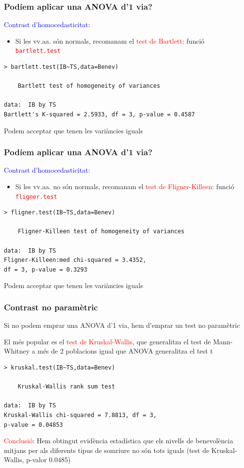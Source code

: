\documentclass[12pt,t]{beamer}
\newcommand{\red}[1]{\textcolor{red}{#1}}
\newcommand{\blue}[1]{\textcolor{blue}{#1}}
\theoremstyle{plain}
\theoremstyle{definition}
\begin{document}
\begin{frame}[fragile] 
\frametitle{Podíem aplicar una ANOVA d'1 via?}\vspace*{-3ex}

\blue{Contrast d'homocedasticitat}:

\begin{itemize}
\item Si les vv.aa. són normals, recomanam el \red{test de Bartlett}: funció \red{\tt bartlett.test}
\end{itemize}
\begin{lstlisting}
> bartlett.test(IB~TS,data=Benev)

	Bartlett test of homogeneity of variances

data:  IB by TS
Bartlett's K-squared = 2.5933, df = 3, p-value = 0.4587
\end{lstlisting}
\medskip

Podem acceptar que tenen les variàncies iguals
\end{frame}

\begin{frame}[fragile] 
\frametitle{Podíem aplicar una ANOVA d'1 via?}\vspace*{-3ex}

\blue{Contrast d'homocedasticitat}:

\begin{itemize}
\item Si les vv.aa. no són normals, recomanam el \red{test de Fligner-Killeen}: funció \red{\tt fligner.test} 
\end{itemize}
\begin{lstlisting}
> fligner.test(IB~TS,data=Benev)

	Fligner-Killeen test of homogeneity of variances

data:  IB by TS
Fligner-Killeen:med chi-squared = 3.4352, 
df = 3, p-value = 0.3293
\end{lstlisting}
\medskip

Podem acceptar que tenen les variàncies iguals
\end{frame}


\begin{frame}[fragile] 
\frametitle{Contrast no paramètric}

Si no podem emprar una ANOVA d'1 via, hem d'emprar un test no paramètric\medskip

El més popular es el \red{test de Kruskal-Wallis}, que generalitza el test de Mann-Whitney a més de 2 poblacions igual que ANOVA generalitza el test t

\begin{lstlisting}
> kruskal.test(IB~TS,data=Benev)     

	Kruskal-Wallis rank sum test

data:  IB by TS
Kruskal-Wallis chi-squared = 7.8813, df = 3, 
p-value = 0.04853
\end{lstlisting}\medskip


\red{Conclusió}: Hem obtingut evidència estadística que els nivells de benevolència mitjans per als diferents tipus de somriure no són tots iguals (test de Kruskal-Wallis, p-valor 0.0485)

\end{frame}
\end{document}
